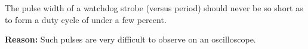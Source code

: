 \chapter{\cwrlzerolongtitle{}}

\label{cwrl0}

\begin{vworklessonslearnedstatement} 
The pulse width of a watchdog strobe (versus period)
should never be so short as to form a duty cycle of under a few percent.
\end{vworklessonslearnedstatement} 

\noindent\textbf{Reason:} Such pulses are very difficult to observe on an 
oscilloscope.



